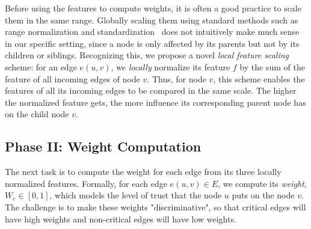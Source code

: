 Before using the features to compute weights, it is often a good practice to scale them in the same range.
Globally scaling them using standard methods such as range normalization and standardization~\cite{mlbook} does not intuitively make much sense in our specific setting, since a node is only affected by its parents but not by its children or siblings. 
Recognizing this, we propose a novel \emph{local feature scaling} scheme: for an edge $e(u, v)$, we \emph{locally} normalize its feature $f$ by the sum of the feature of all incoming edges of node $v$. Thus, for node $v$, this scheme enables the features of all its incoming edges to be compared in the same scale. The higher the normalized feature gets, the more influence its corresponding parent node has on the child node $v$.




\subsection{Phase II: Weight Computation}
\label{subsubsec:weight-computation}
The next task is to compute the weight for each edge from its three locally normalized features.
Formally, for each edge $e(u, v) \in E$, we compute its \emph{weight}, $W_e \in [0, 1]$, which models the level of trust that the node $u$ puts on the node $v$.
The challenge is to make these weights "discriminative", so that critical edges will have high weights and non-critical edges will have low weights.



